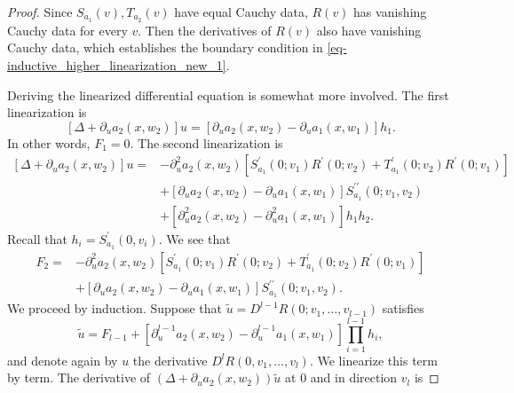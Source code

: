 \documentclass[10pt,a4paper]{amsart}
\begin{document}
\begin{proof}
Since \( S_{a_{1}}(v),T_{a_{2}}(v) \) have equal Cauchy data, \( R(v) \) has vanishing Cauchy data for every \( v \).
Then the derivatives of \( R(v) \) also have vanishing Cauchy data, which establishes the boundary condition in \eqref{eq-inductive_higher_linearization_new_1}.

Deriving the linearized differential equation is somewhat more involved.
The first linearization is
\begin{equation}\label{eq-inductive_higher_linearization_new_3}
	[\Delta+\partial_{u}a_{2}(x,w_{2})]u = [\partial_{u}a_{2}(x,w_{2})-\partial_{u}a_{1}(x,w_{1})]h_{1}.
\end{equation}
In other words, \( F_{1} = 0 \).
The second linearization is
\begin{equation*}
\begin{aligned}
	[\Delta+\partial_{u}a_{2}(x,w_{2})]u = &-\partial_{u}^{2}a_{2}(x,w_{2})[S_{a_{1}}^{\prime}(0;v_{1})R^{\prime}(0;v_{2}) + T_{a_{1}}^{\prime}(0;v_{2})R^{\prime}(0;v_{1})] \\
	&+[\partial_{u}a_{2}(x,w_{2})-\partial_{u}a_{1}(x,w_{1})]S_{a_{1}}^{\prime\prime}(0;v_{1},v_{2}) \\
	&+ [\partial_{u}^{2}a_{2}(x,w_{2})-\partial_{u}^{2}a_{1}(x,w_{1})]h_{1}h_{2}.
\end{aligned}
\end{equation*}
Recall that \( h_{i} = S_{a_{1}}^{\prime}(0,v_{i}) \).
We see that
\begin{equation*}
\begin{aligned}
	F_{2} = &-\partial_{u}^{2}a_{2}(x,w_{2})[S_{a_{1}}^{\prime}(0;v_{1})R^{\prime}(0;v_{2}) + T_{a_{1}}^{\prime}(0;v_{2})R^{\prime}(0;v_{1})] \\
	&+[\partial_{u}a_{2}(x,w_{2})-\partial_{u}a_{1}(x,w_{1})]S_{a_{1}}^{\prime\prime}(0;v_{1},v_{2}).
\end{aligned}
\end{equation*}
We proceed by induction.
Suppose that \( \tilde{u} = D^{l-1}R(0;v_{1},\ldots,v_{l-1}) \) satisfies
\begin{equation*}
	[\Delta + \partial_{u}a_{2}(x,w_{2})]\tilde{u} = F_{l-1} + [\partial_{u}^{l-1}a_{2}(x,w_{2})-\partial_{u}^{l-1}a_{1}(x,w_{1})]\prod_{i=1}^{l-1}h_{i},
\end{equation*}
and denote again by \( u \) the derivative \( D^{l}R(0,v_{1},\ldots,v_{l}) \).
We linearize this term by term.
The derivative of \( (\Delta+\partial_{u}a_{2}(x,w_{2}))\tilde{u} \) at \( 0 \) and in direction \( v_{l} \) is

\end{proof}
\end{document}
